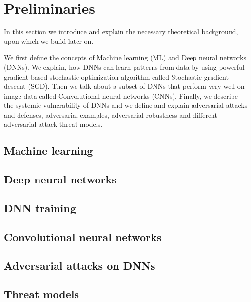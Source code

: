\chapter{Preliminaries}

In this section we introduce and explain the necessary theoretical background, upon which we build later on.

We first define the concepts of Machine learning (ML) and Deep neural networks (DNNs). We explain, how DNNs can learn patterns from data by using powerful gradient-based stochastic optimization algorithm called Stochastic gradient descent (SGD). Then we talk about a subset of DNNs that perform very well on image data called Convolutional neural networks (CNNs). Finally, we describe the systemic vulnerability of DNNs and we define and explain adversarial attacks and defenses, adversarial examples, adversarial robustness and different adversarial attack threat models. 


\section{Machine learning}

\section{Deep neural networks}

\section{DNN training}

\section{Convolutional neural networks}

\section{Adversarial attacks on DNNs}

\section{Threat models}
\cite{Andel07}